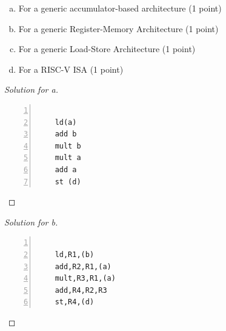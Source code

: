 \documentclass[12pt]{article}
\begin{document}
\begin{enumerate}[a)]
	\item For a generic accumulator-based architecture (1 point)
	\item For a generic Register-Memory Architecture (1 point)
	\item  For a generic Load-Store Architecture (1 point)
	\item For a RISC-V ISA (1 point)
\end{enumerate}
\begin{proof}[Solution for a]
	\begin{lstlisting}[language={python},numbers=left,numberstyle=\tiny,%frame=shadowbox,  
	rulesepcolor=\color{red!20!green!20!blue!20},  
	keywordstyle=\color{blue!70!black},  
	commentstyle=\color{blue!90!},  
	basicstyle=\ttfamily]  
	
	ld(a)
	add b
	mult b
	mult a
	add a
	st (d)
\end{lstlisting}
\end{proof}

\begin{proof}[Solution for b]
	\begin{lstlisting}[language={python},numbers=left,numberstyle=\tiny,%frame=shadowbox,  
		rulesepcolor=\color{red!20!green!20!blue!20},  
		keywordstyle=\color{blue!70!black},  
		commentstyle=\color{blue!90!},  
		basicstyle=\ttfamily]  
		
	ld,R1,(b)
	add,R2,R1,(a)
	mult,R3,R1,(a)
	add,R4,R2,R3
	st,R4,(d)
	\end{lstlisting}
\end{proof}
\end{document}

